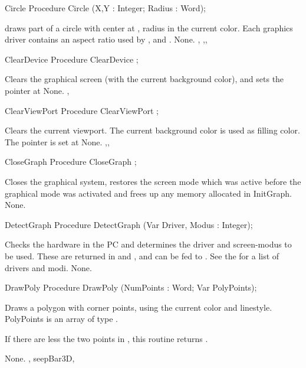 \begin{procedure}{Circle}
\Declaration
Procedure Circle (X,Y : Integer; Radius : Word);

\Description
  draws part of a circle with center at , radius
 in the current color. Each graphics driver contains an
aspect ratio used by ,  and .
\Errors
None.
\SeeAlso
{},
,, 
\end{procedure}

\begin{procedure}{ClearDevice}
\Declaration
Procedure ClearDevice ;

\Description
Clears the graphical screen (with the current
background color), and sets the pointer at 
\Errors
None.
\SeeAlso
{}, 
\end{procedure}

\begin{procedure}{ClearViewPort}
\Declaration
Procedure ClearViewPort ;

\Description
Clears the current viewport. The current background color is used as filling
color. The pointer is set at 
\Errors
None.
\SeeAlso
{},, 
\end{procedure}

\begin{procedure}{CloseGraph}
\Declaration
Procedure CloseGraph ;

\Description
Closes the graphical system, restores the
screen mode which was active before the graphical mode was
activated and frees up any memory allocated in InitGraph.
\Errors
None.
\SeeAlso
{}
\end{procedure}

\begin{procedure}{DetectGraph}
\Declaration
Procedure DetectGraph (Var Driver, Modus : Integer);

\Description
 Checks the hardware in the PC and determines the driver and screen-modus to
be used. These are returned in  and , and can be fed
to .
See the  for a list of drivers and modi.
\Errors
None.
\SeeAlso
{}
\end{procedure}


\begin{procedure}{DrawPoly}
\Declaration
Procedure DrawPoly (NumPoints : Word; Var PolyPoints);

\Description

Draws a polygon with  corner points, using the
current color and linestyle. PolyPoints is an array of type .

If there are less the two points in , this routine
returns .

\Errors
None.
\SeeAlso
{}, seep{Bar3D}, 
\end{procedure}

